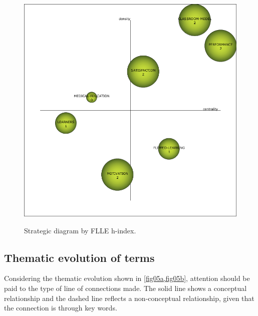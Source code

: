 \documentclass{textolivre-html}
\begin{document}
\begin{figure}[htbp]
\begin{minipage}{.45\textwidth}
 \label{fig04d}
 \end{minipage}
 \par\vspace{2ex}
 \begin{minipage}{.45\textwidth}
 \includegraphics[width=\textwidth]{Fig04e.png}
 \label{fig04e}
 \end{minipage}
 \hfill
 \begin{minipage}{.45\textwidth}
 \hfill
 \end{minipage}
\caption{Strategic diagram by FLLE h-index.}
\label{fig04}
\end{figure}



\subsection{Thematic evolution of terms}\label{sec-thematic}
Considering the thematic evolution shown in \cref{fig05a,fig05b}, attention should be paid to the type of line of connections made. The solid line shows a conceptual relationship and the dashed line reflects a non-conceptual relationship, given that the connection is through key words.
\end{document}

